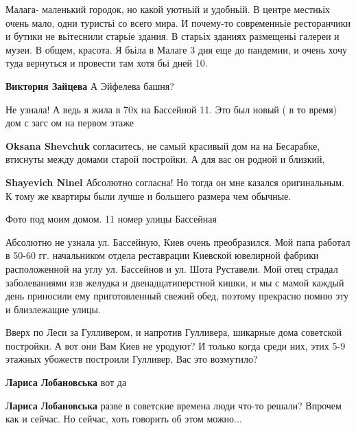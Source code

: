 \begin{itemize}
\begin{itemize}
Малага- маленький городок, но какой уютньій и удобньій. В центре местньіх очень
мало, одни туристьі со всего мира. И почему-то современньіе ресторанчики и
бутики не вьітеснили старьіе здания. В старьіх зданиях размещеньі галереи и
музеи. В общем, красота. Я бьіла в Малаге 3 дня еще до пандемии, и очень хочу
туда вернуться и провести там хотя бьі дней 10.

\textbf{Виктория Зайцева} А Эйфелева башня?

\end{itemize} %


Не узнала! А ведь я жила в 70х на Бассейной 11. Это был новый ( в то время) дом
с загс ом на первом этаже

\begin{itemize} %
\textbf{Oksana Shevchuk} согласитесь, не самый красивый дом на на Бесарабке, втиснуты между домами старой постройки. А для вас он родной и близкий,

\begin{itemize} %
\textbf{Shayevich Ninel}
Абсолютно согласна! Но тогда он мне казался оригинальным. К тому же квартиры были лучше и большего размера чем обычные.
\end{itemize} %

\end{itemize} %

Фото под моим домом. 11 номер улицы Бассейная


Абсолютно не узнала ул. Бассейную, Киев очень преобразился. Мой папа работал в
50-60 гг. начальником отдела реставрации Киевской ювелирной фабрики
расположенной на углу ул. Бассейнов и ул. Шота Руставели. Мой отец страдал
заболеваниями язв желудка и двенадцатиперстной кишки, и мы с мамой каждый день
приносили ему приготовленный свежий обед, поэтому прекрасно помню эту и
близлежащие улицы.


Вверх по Леси за Гулливером, и напротив Гулливера, шикарные дома советской
постройки. А вот они Вам Киев не уродуют? И только когда среди них, этих 5-9
этажных убожеств построили Гулливер, Вас это возмутило?

\begin{itemize} %
\textbf{Лариса Лобановська} вот да

\textbf{Лариса Лобановська} разве в советские времена люди что-то решали? Впрочем как и сейчас. Но сейчас, хоть говорить об этом можно...


\end{itemize}
\end{itemize}
